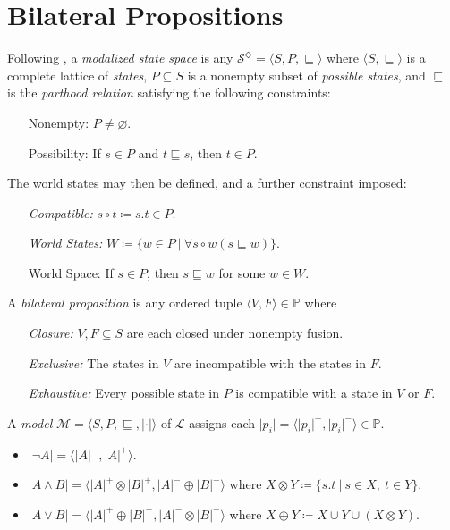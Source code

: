 \documentclass[a4paper, 11pt]{article} %
\theoremstyle{Pthm}
\newcommand{\tuple}[1]{\langle#1\rangle} %
\newcommand{\set}[1]{\lbrace#1\rbrace} %
\renewcommand{\vert}[1]{\lvert#1\rvert}
\begin{document}
\section*{Bilateral Propositions}%

Following \cite{Fine2017d,Fine2017,Fine2017a},  a \textit{modalized state space} is any $\mathcal{S}^\Diamond = \tuple{S,P,\sqsubseteq}$ where $\tuple{S,\sqsubseteq}$ is a complete lattice of \textit{states}, $P\subseteq S$ is a nonempty subset of \textit{possible states}, and $\sqsubseteq$ is the \textit{parthood relation} satisfying the following constraints:
  \begin{enumerate}[leftmargin=1.7in, itemsep=.05in]
    \item[\sc Nonempty:] $P \neq \varnothing$.
    \item[\sc Possibility:] If $s \in P$ and $t\sqsubseteq s$, then $t \in P$. 
  \end{enumerate}
The world states may then be defined, and a further constraint imposed:
  \begin{enumerate}[leftmargin=1.7in, itemsep=.05in]
    \item[\it Compatible:]  $s\circ t \coloneq s.t\in P$. 
    \item[\it World States:] $W \coloneq \set{w \in P\ |\ \forall s \circ w (s \sqsubseteq w)}$.
    \item[\sc World Space:] If $s \in P$, then $s \sqsubseteq w$ for some $w \in W$. 
  \end{enumerate}
A \textit{bilateral proposition} is any ordered tuple $\tuple{V,F} \in \mathbb{P}$ where
  \begin{enumerate}[leftmargin=1in, itemsep=.05in]
    \item[\it Closure:] $V, F \subseteq S$ are each closed under nonempty fusion.
    \item[\it Exclusive:] The states in $V$ are incompatible with the states in $F$.
    \item[\it Exhaustive:] Every possible state in $P$ is compatible with a state in $V$ or $F$.
  \end{enumerate}
A \textit{model} $\mathcal{M} = \tuple{S, P, \sqsubseteq, \vert{\cdot}}$ of $\mathcal{L}$ assigns each $\vert{p_i} = \tuple{\vert{p_i}^+, \vert{p_i}^-} \in \mathbb{P}$.
  \begin{itemize}[leftmargin=.25in, itemsep=.05in]
    \item $\vert{\neg A} = \tuple{\vert{A}^-, \vert{A}^+}$.
    \item $\vert{A\wedge B} = \tuple{\vert{A}^+ \otimes \vert{B}^+,  \vert{A}^- \oplus \vert{B}^-}$ where $X \otimes Y \coloneq \set{s.t \ |\ s \in X,\ t \in Y}$. 
    \item $\vert{A\vee B} = \tuple{\vert{A}^+ \oplus \vert{B}^+,  \vert{A}^- \otimes \vert{B}^-}$ where $X \oplus Y \coloneq X \cup Y \cup (X \otimes Y)$.
  \end{itemize}
\end{document}
